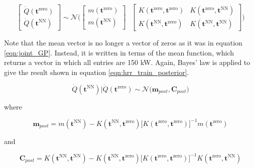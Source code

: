 \documentclass{article}
\begin{document}
\begin{equation}
  \label{eqn:joint_hrr_gp}
  \begin{bmatrix}
  \dot{Q}(\boldsymbol{t}^{\text{zero}}) \\
  \dot{Q}(\boldsymbol{t}^{\text{NN}})
  \end{bmatrix} \sim 
  \mathcal{N} \Bigg( \begin{bmatrix}
  m(\boldsymbol{t}^{\text{zero}}) \\
  m(\boldsymbol{t}^{\text{NN}})      
  \end{bmatrix}  \ \ \ 
  \begin{bmatrix}
 K(\boldsymbol{t}^{\text{zero}}, \boldsymbol{t}^{\text{zero}}) & K(\boldsymbol{t}^{\text{zero}}, \boldsymbol{t}^{\text{NN}}) \\ 
   K(\boldsymbol{t}^{\text{NN}}, \boldsymbol{t}^{\text{zero}}) &  K(\boldsymbol{t}^{\text{NN}}, \boldsymbol{t}^{\text{NN}}) 
  \end{bmatrix}
  \Bigg)
\end{equation}

\noindent Note that the mean vector is no longer a vector of zeros as it was in equation \ref{eqn:joint_GP}.  Instead, it is written in terms of the mean function, which returns a vector in which all entries are 150 kW. Again, Bayes' law is applied to give the result shown in equation \ref{eqn:hrr_train_posterior}.

\begin{equation}
  \label{eqn:hrr_train_posterior}
 \dot{Q}(\boldsymbol{t}^{\text{NN}})  \Big| \dot{Q}(\boldsymbol{t}^{\text{zero}}) \sim 
 \mathcal{N}\Big(\boldsymbol{m}_{post}, \boldsymbol{C}_{post}\Big)
\end{equation}

\noindent where 

$$
\boldsymbol{m}_{post} = 
m(\boldsymbol{t}^{\text{NN}}) -  K(\boldsymbol{t}^{\text{NN}}, \boldsymbol{t}^{\text{zero}})\Big[K(\boldsymbol{t}^{\text{zero}}, \boldsymbol{t}^{\text{zero}}) \Big]^{-1} m(\boldsymbol{t}^{\text{zero}})
$$

\noindent and 

$$
\boldsymbol{C}_{post} = K(\boldsymbol{t}^{\text{NN}}, \boldsymbol{t}^{\text{NN}}) -  K( \boldsymbol{t}^{\text{NN}}, \boldsymbol{t}^{\text{zero}})\Big[K(\boldsymbol{t}^{\text{zero}}, \boldsymbol{t}^{\text{zero}})\Big]^{-1}K(\boldsymbol{t}^{\text{zero}},\boldsymbol{t}^{\text{NN}})
$$
\end{document}

